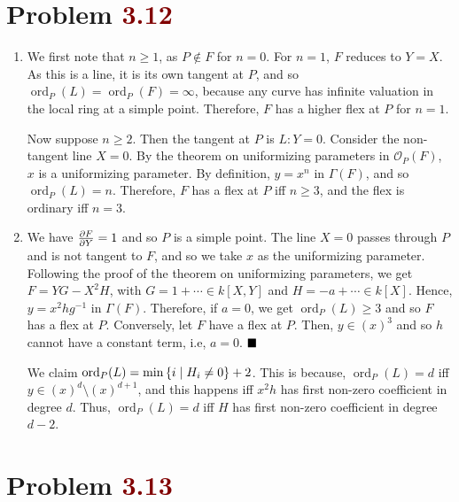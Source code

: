 \documentclass[12pt]{article}
\begin{document}
\section{Problem \textcolor{maroon}{3.12}}
\begin{enumerate}[label = (\alph*)]
    \item We first note that \( n \geq 1 \), as \( P \notin F \) for \( n = 0 \). For \( n = 1 \), \( F \) reduces to \( Y = X \). As this is a line, it is its own tangent at \( P \), and so \( \operatorname{ord}_P(L) = \operatorname{ord}_P(F) = \infty \), because any curve has infinite valuation in the local ring at a simple point. Therefore, \( F \) has a higher flex at \( P \) for \( n = 1 \).
          \smallskip

          Now suppose \( n \geq 2 \). Then the tangent at \( P \) is \( L: Y = 0 \). Consider the non-tangent line \( X = 0 \). By the theorem on uniformizing parameters in \( \mathscr{O}_P(F) \), \( x \) is a uniformizing parameter. By definition, \( y = x^n \) in \( \Gamma(F) \), and so \( \operatorname{ord}_P(L) = n \). Therefore, \( F \) has a flex at \( P \) iff \( n \geq 3 \), and the flex is ordinary iff \( n =3 \).
          \smallskip

    \item We have \( \pdv{F}{Y}(P) = 1 \) and so \( P \) is a simple point. The line \( X=0 \) passes through \( P \) and is not tangent to \( F \), and so we take \( x \) as the uniformizing parameter. Following the proof of the theorem on uniformizing parameters, we get \( F = YG-X^2H \), with \( G = 1 + \cdots \in k[X,Y]\) and \( H =  -a + \cdots \in k[X] \). Hence, \( y = x^2hg^{-1} \) in \( \Gamma(F) \). Therefore, if \( a = 0 \), we get \( \operatorname{ord}_P(L) \geq 3 \) and so \( F \) has a flex at \( P \). Conversely, let \( F \) have a flex at \( P \). Then, \( y \in (x)^3 \) and so \( h \) cannot have a constant term, i.e, \( a = 0 \). \(\hfill \blacksquare\)
          \smallskip

          We claim \( \operatorname{ord}_P(L) = \min\qty{i \mid H_i \neq 0} + 2 \). This is because, \( \operatorname{ord}_P(L) = d \) iff \( y \in (x)^d \setminus (x)^{d+1} \), and this happens iff \( x^2h \) has first non-zero coefficient in degree \( d \). Thus, \( \operatorname{ord}_P(L) = d \) iff \( H \) has first non-zero coefficient in degree \( d-2 \).
\end{enumerate}

\section{Problem \textcolor{maroon}{3.13}}
\end{document}
